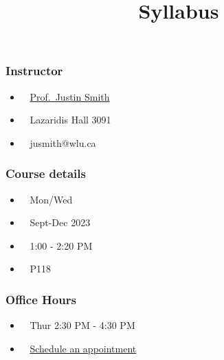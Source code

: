 \documentclass[
  letterpaper,
  DIV=11,
  numbers=noendperiod]{scrartcl}
\title{Syllabus}
\author{}
\date{}
\providecommand{\tightlist}{%
  \setlength{\itemsep}{0pt}\setlength{\parskip}{0pt}}\usepackage{longtable,booktabs,array}
\begin{document}
\maketitle
\ifdefined\Shaded\renewenvironment{Shaded}{\begin{tcolorbox}[enhanced, boxrule=0pt, interior hidden, breakable, borderline west={3pt}{0pt}{shadecolor}, sharp corners, frame hidden]}{\end{tcolorbox}}\fi

\hypertarget{instructor}{%
\subsubsection{Instructor}\label{instructor}}

\begin{itemize}
\tightlist
\item
   ~ \href{https://justinsmithecon.github.io}{Prof.~Justin
  Smith}
\item
   ~ Lazaridis Hall 3091
\item
   ~ jusmith@wlu.ca
\end{itemize}

\hypertarget{course-details}{%
\subsubsection{Course details}\label{course-details}}

\begin{itemize}
\tightlist
\item
   ~ Mon/Wed
\item
   ~ Sept-Dec 2023
\item
   ~ 1:00 - 2:20 PM
\item
   ~ P118
\end{itemize}

\hypertarget{office-hours}{%
\subsubsection{Office Hours}\label{office-hours}}

\begin{itemize}
\tightlist
\item
   ~ Thur 2:30 PM - 4:30 PM
\item
   ~
  \href{https://outlook.office365.com/owa/calendar/BookaTimewithDrJustinSmith@wlu.ca/bookings/}{Schedule
  an appointment}
\end{itemize}
\end{document}
